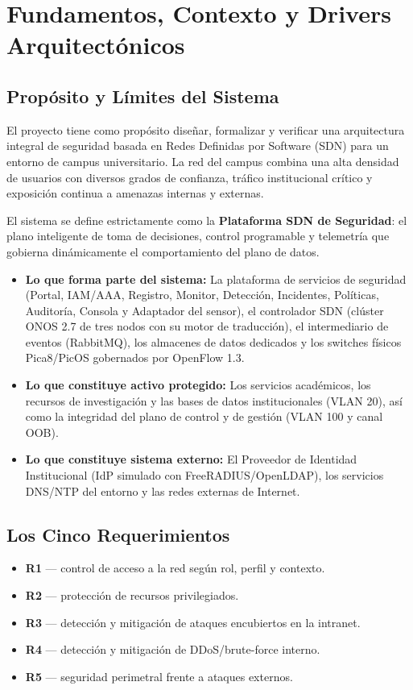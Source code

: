 \documentclass[11pt,a4paper]{report}
\begin{document}
\chapter{Fundamentos, Contexto y Drivers Arquitectónicos}

\section{Propósito y Límites del Sistema}
El proyecto tiene como propósito diseñar, formalizar y verificar una arquitectura integral de seguridad basada en Redes Definidas por Software (SDN) para un entorno de campus universitario. La red del campus combina una alta densidad de usuarios con diversos grados de confianza, tráfico institucional crítico y exposición continua a amenazas internas y externas.

El sistema se define estrictamente como la \textbf{Plataforma SDN de Seguridad}: el plano inteligente de toma de decisiones, control programable y telemetría que gobierna dinámicamente el comportamiento del plano de datos.

\begin{itemize}[leftmargin=*]
    \item \textbf{Lo que forma parte del sistema:} La plataforma de servicios de seguridad (Portal, IAM/AAA, Registro, Monitor, Detección, Incidentes, Políticas, Auditoría, Consola y Adaptador del sensor), el controlador SDN (clúster ONOS 2.7 de tres nodos con su motor de traducción), el intermediario de eventos (RabbitMQ), los almacenes de datos dedicados y los switches físicos Pica8/PicOS gobernados por OpenFlow 1.3.
    \item \textbf{Lo que constituye activo protegido:} Los servicios académicos, los recursos de investigación y las bases de datos institucionales (VLAN 20), así como la integridad del plano de control y de gestión (VLAN 100 y canal OOB).
    \item \textbf{Lo que constituye sistema externo:} El Proveedor de Identidad Institucional (IdP simulado con FreeRADIUS/OpenLDAP), los servicios DNS/NTP del entorno y las redes externas de Internet.
\end{itemize}

\section{Los Cinco Requerimientos}
\begin{itemize}
\item \textbf{R1} --- control de acceso a la red según rol, perfil y contexto.
\item \textbf{R2} --- protección de recursos privilegiados.
\item \textbf{R3} --- detección y mitigación de ataques encubiertos en la intranet.
\item \textbf{R4} --- detección y mitigación de DDoS/brute-force interno.
\item \textbf{R5} --- seguridad perimetral frente a ataques externos.
\end{itemize}
\end{document}
